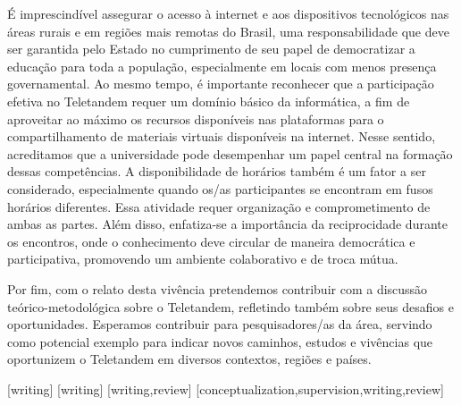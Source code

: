 \documentclass[portuguese]{textolivre}
\begin{document}
É imprescindível assegurar o acesso à internet e aos dispositivos tecnológicos nas áreas rurais e em regiões mais remotas do Brasil, uma responsabilidade que deve ser garantida pelo Estado no cumprimento de seu papel de democratizar a educação para toda a população, especialmente em locais com menos presença governamental. Ao mesmo tempo, é importante reconhecer que a participação efetiva no Teletandem requer um domínio básico da informática, a fim de aproveitar ao máximo os recursos disponíveis nas plataformas para o compartilhamento de materiais virtuais disponíveis na internet. Nesse sentido, acreditamos que a universidade pode desempenhar um papel central na formação dessas competências. A disponibilidade de horários também é um fator a ser considerado, especialmente quando os/as participantes se encontram em fusos horários diferentes. Essa atividade requer organização e comprometimento de ambas as partes. Além disso, enfatiza-se a importância da reciprocidade durante os encontros, onde o conhecimento deve circular de maneira democrática e participativa, promovendo um ambiente colaborativo e de troca mútua.

Por fim, com o relato desta vivência pretendemos contribuir com a discussão teórico-metodológica sobre o Teletandem, refletindo também sobre seus desafios e oportunidades. Esperamos contribuir para pesquisadores/as da área, servindo como potencial exemplo para indicar novos caminhos, estudos e vivências que oportunizem o Teletandem em diversos contextos, regiões e países. 

\printbibliography\label{sec-bib}


\begin{contributors}
[writing]
[writing]
[writing,review]
[conceptualization,supervision,writing,review]
\end{contributors}
\end{document}
